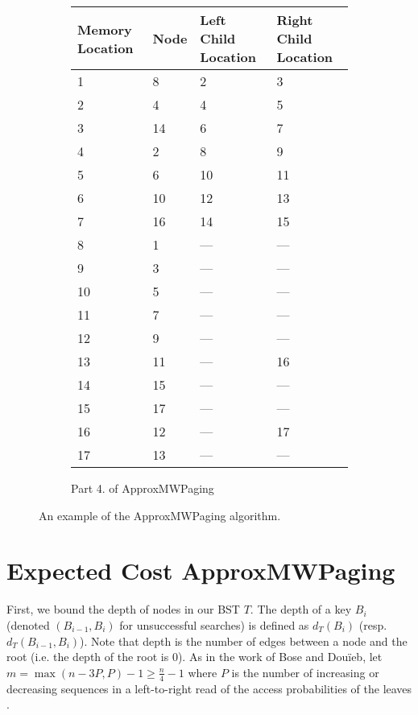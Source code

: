 \documentclass[letterpaper,12pt,titlepage,oneside,final]{book}
\theoremstyle{plain}
\begin{document}
\begin{figure}[H]
\begin{center}
\begin{subfigure}[b]{0.72\textwidth}
\begin{center}
    \begin{tabular}{ | l | l | l | p{5cm} |}
    \hline
    Memory Location & Node & Left Child Location & Right Child Location \\ \hline
    1  & 8  & 2    & 3    \\ \hline
    2  & 4  & 4    & 5    \\ \hline
    3  & 14 & 6    & 7    \\ \hline
    4  & 2  & 8    & 9    \\ \hline
    5  & 6  & 10   & 11   \\ \hline
    6  & 10 & 12   & 13   \\ \hline
    7  & 16 & 14   & 15   \\ \hline
    8  & 1  & --- & --- \\ \hline
    9  & 3  & --- & --- \\ \hline
    10 & 5  & --- & --- \\ \hline
    11 & 7  & --- & --- \\ \hline
    12 & 9  & --- & --- \\ \hline
    13 & 11 & --- & 16   \\ \hline
    14 & 15 & --- & --- \\ \hline
    15 & 17 & --- & --- \\ \hline
    16 & 12 & --- & 17   \\ \hline
    17 & 13 & --- & --- \\ \hline
    \end{tabular}
\end{center}

\caption{Part 4. of ApproxMWPaging}
\end{subfigure}
\end{center}


\caption{An example of the ApproxMWPaging algorithm.}
\end{figure}


\section{Expected Cost ApproxMWPaging} \label{45}

First, we bound the depth of nodes in our BST $T$. The depth of a key $B_i$ (denoted $(B_{i-1}, B_i)$ for unsuccessful searches) is defined as $d_T(B_i)$ (resp. $d_T(B_{i-1},B_i)$). Note that depth is the number of edges between a node and the root (i.e. the depth of the root is $0$). As in the work of Bose and Dou\"{i}eb, let $m=\max({n-3P,P})-1 \geq \frac{n}{4} - 1$ where $P$ is the number of increasing or decreasing sequences in a left-to-right read of the access probabilities of the leaves \cite{bose2009efficient}.
\end{document}
